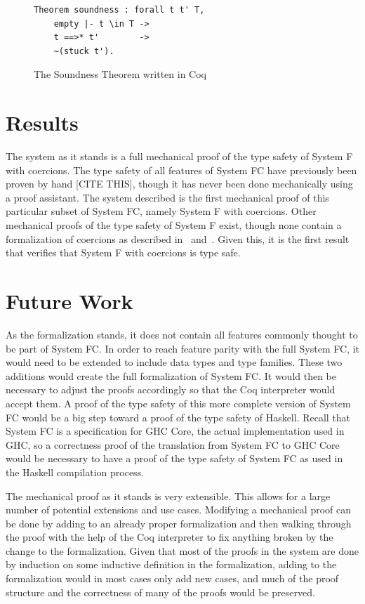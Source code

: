 \documentclass{sig-alternate}
\begin{document}
\begin{figure}[h!]
\begin{lstlisting}
Theorem soundness : forall t t' T,
    empty |- t \in T ->
    t ==>* t'        ->
    ~(stuck t').
\end{lstlisting}
\caption{The Soundness Theorem written in Coq}
\label{fig:soundness-coq}
\end{figure}

\section{Results}
\label{sec:results}

The system as it stands is a full mechanical proof of the type safety of System F with coercions. The type safety of all features of System FC have previously been proven by hand [CITE THIS], though it has never been done mechanically using a proof assistant. The system described is the first mechanical proof of this particular subset of System FC, namely System F with coercions. Other mechanical proofs of the type safety of System F exist, though none contain a formalization of coercions as described in~\cite{Breitner:2014:SZC:2628136.2628141} and~\cite{DBLP:conf/tldi/YorgeyWCJVM12}. Given this, it is the first result that verifies that System F with coercions is type safe. 

\section{Future Work}
\label{sec:future-work}

As the formalization stands, it does not contain all features commonly thought to be part of System FC. In order to reach feature parity with the full System FC, it would need to be extended to include data types and type families. These two additions would create the full formalization of System FC. It would then be necessary to adjust the proofs accordingly so that the Coq interpreter would accept them. A proof of the type safety of this more complete version of System FC would be a big step toward a proof of the type safety of Haskell. Recall that System FC is a specification for GHC Core, the actual implementation used in GHC, so a correctness proof of the translation from System FC to GHC Core would be necessary to have a proof of the type safety of System FC as used in the Haskell compilation process.

The mechanical proof as it stands is very extensible. This allows for a large number of potential extensions and use cases. Modifying a mechanical proof can be done by adding to an already proper formalization and then walking through the proof with the help of the Coq interpreter to fix anything broken by the change to the formalization. Given that most of the proofs in the system are done by induction on some inductive definition in the formalization, adding to the formalization would in most cases only add new cases, and much of the proof structure and the correctness of many of the proofs would be preserved.
\end{document}

